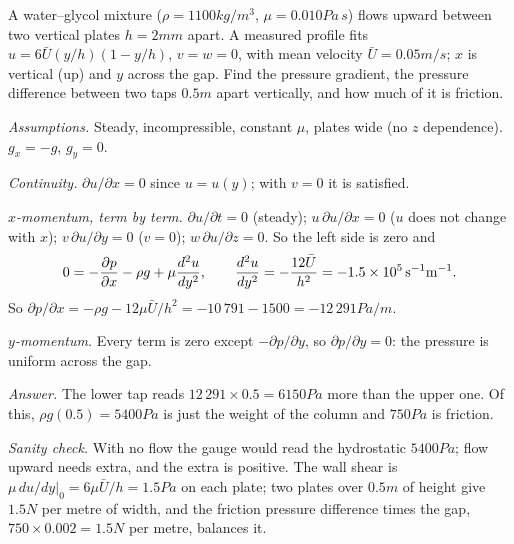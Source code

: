 \begin{example}
A water--glycol mixture ($\rho = 1100\unit{kg/m^3}$, $\mu = 0.010\unit{Pa\,s}$) flows upward between two vertical plates $h = 2\unit{mm}$ apart. A measured profile fits $u = 6\bar U(y/h)(1 - y/h)$, $v = w = 0$, with mean velocity $\bar U = 0.05\unit{m/s}$; $x$ is vertical (up) and $y$ across the gap. Find the pressure gradient, the pressure difference between two taps $0.5\unit{m}$ apart vertically, and how much of it is friction.

\emph{Assumptions.} Steady, incompressible, constant $\mu$, plates wide (no $z$ dependence). $g_x = -g$, $g_y = 0$.

\emph{Continuity.} $\partial u/\partial x = 0$ since $u = u(y)$; with $v = 0$ it is satisfied.

\emph{$x$-momentum, term by term.} $\partial u/\partial t = 0$ (steady); $u\,\partial u/\partial x = 0$ ($u$ does not change with $x$); $v\,\partial u/\partial y = 0$ ($v = 0$); $w\,\partial u/\partial z = 0$. So the left side is zero and
\[
0 = -\frac{\partial p}{\partial x} - \rho g + \mu\frac{d^2u}{dy^2}, \qquad \frac{d^2u}{dy^2} = -\frac{12\bar U}{h^2} = -1.5\times10^5\,\mathrm{s^{-1}m^{-1}} .
\]
So $\partial p/\partial x = -\rho g - 12\mu\bar U/h^2 = -10\,791 - 1500 = -12\,291\unit{Pa/m}$.

\emph{$y$-momentum.} Every term is zero except $-\partial p/\partial y$, so $\partial p/\partial y = 0$: the pressure is uniform across the gap.

\emph{Answer.} The lower tap reads $12\,291 \times 0.5 = 6150\unit{Pa}$ more than the upper one. Of this, $\rho g(0.5) = 5400\unit{Pa}$ is just the weight of the column and $750\unit{Pa}$ is friction.

\emph{Sanity check.} With no flow the gauge would read the hydrostatic $5400\unit{Pa}$; flow upward needs extra, and the extra is positive. The wall shear is $\mu\,du/dy|_0 = 6\mu\bar U/h = 1.5\unit{Pa}$ on each plate; two plates over $0.5\unit{m}$ of height give $1.5\unit{N}$ per metre of width, and the friction pressure difference times the gap, $750 \times 0.002 = 1.5\unit{N}$ per metre, balances it.
\end{example}


